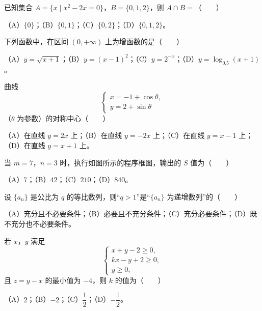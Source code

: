 \begin{question}
已知集合 $A=\{x\mid x^2-2x=0\}$，$B=\{0,1,2\}$，则 $A\cap B=$\mbox{（　　）}

（A）$\{0\}$；（B）$\{0,1\}$；（C）$\{0,2\}$；（D）$\{0,1,2\}$。

\end{question}
\begin{question}
下列函数中，在区间 $(0,+\infty)$ 上为增函数的是\mbox{（　　）}

（A）$y=\sqrt{x+1}$；（B）$y=(x-1)^2$；（C）$y=2^{-x}$；（D）$y=\log_{0.5}(x+1)$。

\end{question}
\begin{question}
曲线
\nopagebreak[4]
\[\begin{cases}
x=-1+\cos\theta,\\
y=2+\sin\theta
\end{cases}\]
（$\theta$ 为参数）的对称中心\mbox{（　　）}

（A）在直线 $y=2x$ 上；（B）在直线 $y=-2x$ 上；（C）在直线 $y=x-1$ 上；（D）在直线 $y=x+1$ 上。

\Needspace{0.4\textheight}
\end{question}
\begin{question}
当 $m=7$，$n=3$ 时，执行如图所示的程序框图，输出的 $S$ 值为\mbox{（　　）}
\nopagebreak[4]
\begin{center}\end{center}
\nopagebreak[4]
（A）$7$；（B）$42$；（C）$210$；（D）$840$。

\end{question}
\begin{question}
设 $\{a_n\}$ 是公比为 $q$ 的等比数列，则“$q>1$”是“$\{a_n\}$ 为递增数列”的\mbox{（　　）}

（A）充分且不必要条件；（B）必要且不充分条件；（C）充分必要条件；（D）既不充分也不必要条件。

\end{question}
\begin{question}
若 $x$，$y$ 满足
\nopagebreak[4]
\[\begin{cases}
x+y-2\geqslant 0,\\
kx-y+2\geqslant 0,\\
y\geqslant 0,
\end{cases}\]
且 $z=y-x$ 的最小值为 $-4$，则 $k$ 的值为\mbox{（　　）}

（A）$2$；（B）$-2$；（C）$\dfrac12$；（D）$-\dfrac12$。

\end{question}
